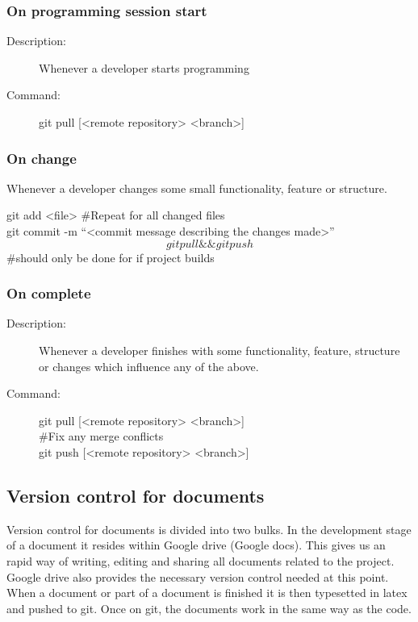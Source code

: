 \subsubsection{On programming session start}
\begin{description}
\item[Description:] Whenever a developer starts programming
\item[Command:] git pull [<remote repository> <branch>]
\end{description}

\subsubsection{On change}
\begin{description}[style=multiline]
\item[Description:] Whenever a developer changes some small functionality, feature or structure.
\item[Command:] git add <file> \#Repeat for all changed files \\ git commit -m “<commit message describing the changes made>” \\  \[git pull \&\& git push\] \#should only be done for if project builds
\end{description}

\subsubsection{On complete}
\begin{description}
\item[Description:]  Whenever a developer finishes with some functionality, feature,  structure or changes which influence 				any of the above.
\item[Command:]  git pull [<remote repository> <branch>] \\  \#Fix any merge conflicts \\ git push [<remote repository> <branch>]
\end{description}

\subsection{Version control for documents}
Version control for documents is divided into two bulks. In the development stage of a document it resides within Google drive (Google docs). This gives us an rapid way of writing, editing and sharing all documents related to the project. Google drive also provides the necessary version control needed at this point. When a document or part of a document is finished it is then typesetted in latex and pushed to git. Once on git, the documents work in the same way as the code.  


